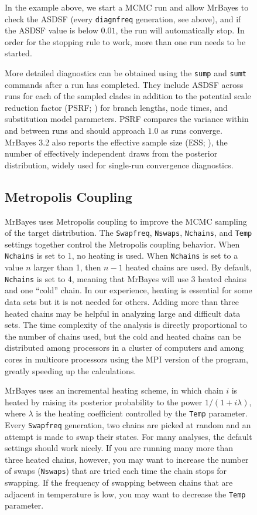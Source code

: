 \documentclass[12pt]{book}
\newcommand{\ttt}[1]{\texttt{#1}}
\begin{document}
\begin{figure}[h]
In the example above, we start a MCMC run and allow MrBayes to check the ASDSF (every
\ttt{diagnfreq} generation, see above), and if the ASDSF value is below $0.01$, the run will
automatically stop. In order for the stopping rule to work, more than one run needs to be started.

More detailed diagnostics can be obtained using the \ttt{sump} and \ttt{sumt} commands after a run
has completed. They include ASDSF across runs for each of the sampled clades in addition to the
potential scale reduction factor (PSRF; \citep{gelman92}) for branch lengths, node times, and
substitution model parameters. PSRF compares the variance within and between runs and should
approach $1.0$ as runs converge. MrBayes 3.2 also reports the effective sample size (ESS;
\citep{ripley87}), the number of effectively independent draws from the posterior distribution,
widely used for single-run convergence diagnostics.


\subsection{Metropolis Coupling}
\label{metropolisCoupling}

MrBayes uses Metropolis coupling to improve the MCMC sampling of the target distribution. The
\ttt{Swapfreq}, \ttt{Nswaps}, \ttt{Nchains}, and \ttt{Temp} settings together control the
Metropolis coupling behavior. When \ttt{Nchains} is set to 1, no heating is used. When
\ttt{Nchains} is set to a value $n$ larger than 1, then $n - 1$ heated chains are used. By default,
\ttt{Nchains} is set to 4, meaning that MrBayes will use 3 heated chains and one ``cold'' chain. In
our experience, heating is essential for some data sets but it is not needed for others. Adding
more than three heated chains may be helpful in analyzing large and difficult data sets. The time
complexity of the analysis is directly proportional to the number of chains used, but the cold and
heated chains can be distributed among processors in a cluster of computers and among cores in
multicore processors using the MPI version of the program, greatly speeding up the calculations.

MrBayes uses an incremental heating scheme, in which chain $i$ is heated by raising its posterior
probability to the power $1/ (1 + i\lambda)$, where $\lambda$ is the heating coefficient controlled
by the \ttt{Temp} parameter. Every \ttt{Swapfreq} generation, two chains are picked at random and
an attempt is made to swap their states. For many analyses, the default settings should work
nicely. If you are running many more than three heated chains, however, you may want to increase
the number of swaps (\ttt{Nswaps}) that are tried each time the chain stops for swapping. If the
frequency of swapping between chains that are adjacent in temperature is low, you may want to
decrease the \ttt{Temp} parameter.


\end{figure}
\end{document}
